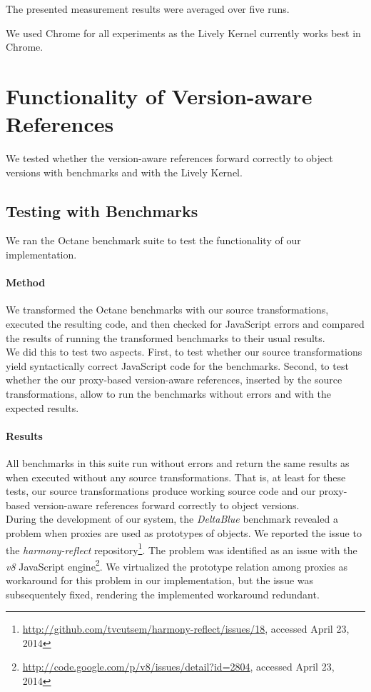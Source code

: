 The presented measurement results were averaged over five runs.

We used Chrome for all experiments as the Lively Kernel currently works best in Chrome.



\section{Functionality of Version-aware References} \label{sec:EVALUATION:2}

We tested whether the version-aware references forward correctly to object versions with benchmarks and with the Lively Kernel.

\subsection{Testing with Benchmarks}

We ran the Octane benchmark suite to test the functionality of our implementation.

\paragraph{Method}
We transformed the Octane benchmarks with our source transformations, executed the resulting code, and then checked for JavaScript errors and compared the results of running the transformed benchmarks to their usual results.\\
We did this to test two aspects.
First, to test whether our source transformations yield syntactically correct JavaScript code for the benchmarks.
Second, to test whether the our proxy-based version-aware references, inserted by the source transformations, allow to run the benchmarks without errors and with the expected results.


\paragraph{Results}
All benchmarks in this suite run without errors and return the same results as when executed without any source transformations.
That is, at least for these tests, our source transformations produce working source code and our proxy-based version-aware references forward correctly to object versions.\\
During the development of our system, the \emph{DeltaBlue} benchmark revealed a problem when proxies are used as prototypes of objects.
We reported the issue to the \emph{harmony-reflect} repository\footnote{\url{http://github.com/tvcutsem/harmony-reflect/issues/18}, accessed April 23, 2014}.
The problem was identified as an issue with the \emph{v8} JavaScript engine\footnote{\url{http://code.google.com/p/v8/issues/detail?id=2804}, accessed April 23, 2014}.
We virtualized the prototype relation among proxies as workaround for this problem in our implementation, but the issue was subsequentely fixed, rendering the implemented workaround redundant.

